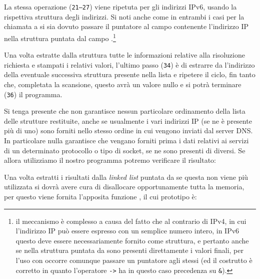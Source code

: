 La stessa operazione (\texttt{\small 21--27}) viene ripetuta per gli indirizzi
IPv6, usando la rispettiva struttura degli indirizzi. Si noti anche come in
entrambi i casi per la chiamata a  si sia dovuto passare il
puntatore al campo contenente l'indirizzo IP nella struttura puntata dal campo
.\footnote{il meccanismo è complesso a causa del fatto che al
  contrario di IPv4, in cui l'indirizzo IP può essere espresso con un semplice
  numero intero, in IPv6 questo deve essere necessariamente fornito come
  struttura, e pertanto anche se nella struttura puntata da 
  sono presenti direttamente i valori finali, per l'uso con 
  occorre comunque passare un puntatore agli stessi (ed il costrutto
   è corretto in quanto l'operatore \texttt{->} ha
  in questo caso precedenza su \texttt{\&}).}

Una volta estratte dalla struttura  tutte le informazioni
relative alla risoluzione richiesta e stampati i relativi valori, l'ultimo
passo (\texttt{\small 34}) è di estrarre da  l'indirizzo della
eventuale successiva struttura presente nella lista e ripetere il ciclo, fin
tanto che, completata la scansione, questo avrà un valore nullo e si potrà
terminare (\texttt{\small 36}) il programma.

Si tenga presente che  non garantisce nessun particolare
ordinamento della lista delle strutture  restituite, anche se
usualmente i vari indirizzi IP (se ne è presente più di uno) sono forniti
nello stesso ordine in cui vengono inviati dal server DNS. In particolare
nulla garantisce che vengano forniti prima i dati relativi ai servizi di un
determinato protocollo o tipo di socket, se ne sono presenti di diversi.  Se
allora utilizziamo il nostro programma potremo verificare il risultato:

Una volta estratti i risultati dalla \textit{linked list} puntata
da  se questa non viene più utilizzata si dovrà avere cura di
disallocare opportunamente tutta la memoria, per questo viene fornita
l'apposita funzione , il cui prototipo è:


